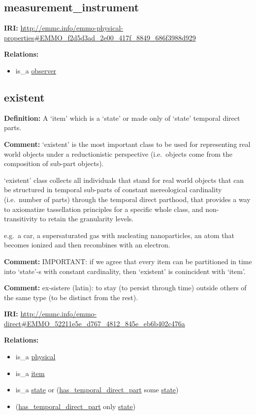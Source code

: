 \documentclass[a4paper,]{report}
\providecommand{\tightlist}{%
  \setlength{\itemsep}{0pt}\setlength{\parskip}{0pt}}
\begin{document}
\hypertarget{measurement_instrument}{%
\subsection{measurement\_instrument}\label{measurement_instrument}}

\textbf{IRI:}
\url{http://emmc.info/emmo-physical-properties\#EMMO_f2d5d3ad_2e00_417f_8849_686f3988d929}

\textbf{Relations:}

\begin{itemize}
\tightlist
\item
  is\_a \protect\hyperlink{observer}{observer}
\end{itemize}

\hypertarget{existent-1}{%
\subsection{existent}\label{existent-1}}

\textbf{Definition:} A `item' which is a `state' or made only of `state'
temporal direct parts.

\textbf{Comment:} `existent' is the most important class to be used for
representing real world objects under a reductionistic perspective
(i.e.~objects come from the composition of sub-part objects).

`existent' class collects all individuals that stand for real world
objects that can be structured in temporal sub-parts of constant
mereological cardinality (i.e.~number of parts) through the temporal
direct parthood, that provides a way to axiomatize tassellation
principles for a specific whole class, and non-transitivity to retain
the granularity levels.

e.g.~a car, a supersaturated gas with nucleating nanoparticles, an atom
that becomes ionized and then recombines with an electron.

\textbf{Comment:} IMPORTANT: if we agree that every item can be
partitioned in time into `state'-s with constant cardinality, then
`existent' is conincident with `item'.

\textbf{Comment:} ex-sistere (latin): to stay (to persist through time)
outside others of the same type (to be distinct from the rest).

\textbf{IRI:}
\url{http://emmc.info/emmo-direct\#EMMO_52211e5e_d767_4812_845e_eb6b402c476a}

\textbf{Relations:}

\begin{itemize}
\tightlist
\item
  is\_a \protect\hyperlink{physical}{physical}
\item
  is\_a \protect\hyperlink{item}{item}
\item
  is\_a \protect\hyperlink{state}{state} or
  (\protect\hyperlink{has_temporal_direct_part}{has\_temporal\_direct\_part}
  some \protect\hyperlink{state}{state})
\item
  (\protect\hyperlink{has_temporal_direct_part}{has\_temporal\_direct\_part}
  only \protect\hyperlink{state}{state})
\end{itemize}
\end{document}
